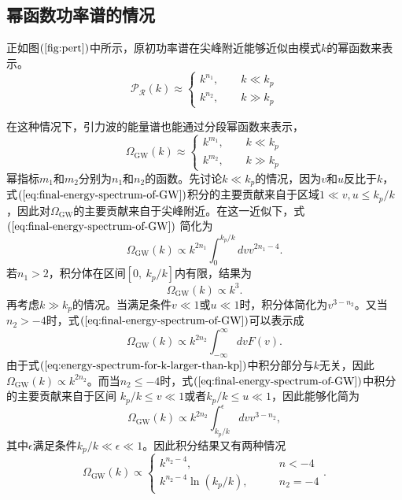 \subsection{幂函数功率谱的情况}
正如图$(\ref{fig:pert})$中所示，原初功率谱在尖峰附近能够近似由模式$k$的幂函数来表示。
\begin{equation}
  \mathcal{P}_{\mathcal{R}}(k) \approx
  \begin{cases}
    k^{n_1},  \qquad k \ll k_{p} \\
    k^{n_2}, \qquad k \gg k_{p}
  \end{cases}
\end{equation}

在这种情况下，引力波的能量谱也能通过分段幂函数来表示，
\begin{equation}
  \Omega_{\text{GW}}(k) \approx
  \begin{cases}
    k^{m_1}, \qquad k \ll k_{p} \\
    k^{m_2}, \qquad k\gg k_{p}
  \end{cases}
\end{equation}
幂指标$m_1$和$m_2$分别为$n_1$和$n_2$的函数。先讨论$k\ll
k_{p}$的情况，因为$v$和$u$反比于$k$，式$(\ref{eq:final-energy-spectrum-of-GW})$积分的主要贡献来自于区域$1\ll
v,u\le k_{p}
/k$，因此对$\Omega_{\text{GW}}$的主要贡献来自于尖峰附近。在这一近似下，式$(\ref{eq:final-energy-spectrum-of-GW})$
简化为
\begin{equation}
  \Omega_{\text{GW}}(k) \propto k^{2n_1} \int_{0}^{k_{p} /k} dv v^{2n_1-4}.
\end{equation}
若$n_1 > 2$，积分体在区间$ \left[ 0,\ k_{p}/k \right]$内有限，结果为
\begin{equation}
  \Omega_{\text{GW}}(k) \propto k^3. 
\end{equation}
再考虑$k\gg k_{p}$的情况。当满足条件$v\ll 1$或$u\ll
1$时，积分体简化为$v^{3-n_2}$。又当$n_2 >
-4$时，式$(\ref{eq:final-energy-spectrum-of-GW})$可以表示成
\begin{equation}
  \label{eq:energy-spectrum-for-k-larger-than-kp}
  \Omega_{\text{GW}}(k) \propto k^{2n_2} \int_{-\infty}^{\infty} dv F(v).  
\end{equation}
由于式$(\ref{eq:energy-spectrum-for-k-larger-than-kp})$中积分部分与$k$无关，因此$\Omega_{\text{GW}}(k)
\propto k^{2n_2}$。而当$n_2\le
-4$时，式$(\ref{eq:final-energy-spectrum-of-GW})$中积分的主要贡献来自于区间
$k_{p}/k \le v\ll 1$或者$k_{p}/k \le u\ll 1$，因此能够化简为
\begin{equation}
  \Omega_{\text{GW}}(k) \propto k^{2n_2} \int_{k_{p}/k}^{\epsilon} dv
  v^{3-n_2},   
\end{equation}
其中$\epsilon$满足条件$k_{p}/k\ll \epsilon\ll 1$。因此积分结果又有两种情况
\begin{equation}
  \Omega_{\text{GW}}(k) \propto
  \begin{cases}
    k^{n_2-4} , \qquad & n < -4 \\
    k^{n_2-4}\ln (k_{p}/k), \qquad & n_2= -4
  \end{cases}.
\end{equation}

